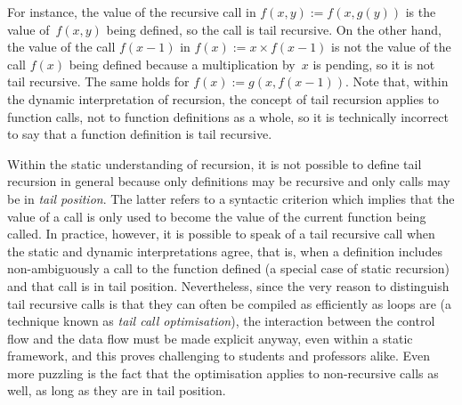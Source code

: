 \documentclass[11pt,a4paper]{article}
\begin{document}
For instance, the value of the recursive call in \(f(x,y) :=
f(x,g(y))\) is the value of~\(f(x,y)\) being defined, so the call is
tail recursive. On the other hand, the value of the call \(f(x-1)\) in
\(f(x) := x \times f(x-1)\) is not the value of the call \(f(x)\)
being defined because a multiplication by~\(x\) is pending, so it is
not tail recursive. The same holds for \(f(x) := g(x,f(x-1))\). Note
that, within the dynamic interpretation of recursion, the concept of
tail recursion applies to function calls, not to function definitions
as a whole, so it is technically incorrect to say that a function
definition is tail recursive.

Within the static understanding of recursion, it is not possible to
define tail recursion in general because only definitions may be
recursive and only calls may be in \emph{tail position}. The latter
refers to a syntactic criterion which implies that the value of a call
is only used to become the value of the current function being
called. In practice, however, it is possible to speak of a tail
recursive call when the static and dynamic interpretations agree, that
is, when a definition includes non\hyp{}ambiguously a call to the
function defined (a special case of static recursion) and that call is
in tail position. Nevertheless, since the very reason to distinguish
tail recursive calls is that they can often be compiled as efficiently
as loops are (a technique known as \emph{tail call optimisation}), the
interaction between the control flow and the data flow must be made
explicit anyway, even within a static framework, and this proves
challenging to students and professors alike. Even more puzzling is
the fact that the optimisation applies to non\hyp{}recursive calls as
well, as long as they are in tail position.
\end{document}
